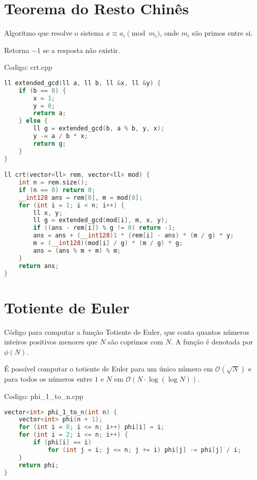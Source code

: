 \documentclass[10pt, a4paper, oneside]{book}
\begin{document}
\section{Teorema do Resto Chinês}


Algoritmo que resolve o sistema $x \equiv a_i \pmod{m_i}$, onde $m_i$ são primos entre si.



Retorna $-1$ se a resposta não existir.

\hfill

Codigo: crt.cpp

\begin{lstlisting}[language=C++]
ll extended_gcd(ll a, ll b, ll &x, ll &y) {
    if (b == 0) {
        x = 1;
        y = 0;
        return a;
    } else {
        ll g = extended_gcd(b, a % b, y, x);
        y -= a / b * x;
        return g;
    }
}

ll crt(vector<ll> rem, vector<ll> mod) {
    int n = rem.size();
    if (n == 0) return 0;
    __int128 ans = rem[0], m = mod[0];
    for (int i = 1; i < n; i++) {
        ll x, y;
        ll g = extended_gcd(mod[i], m, x, y);
        if ((ans - rem[i]) % g != 0) return -1;
        ans = ans + (__int128)1 * (rem[i] - ans) * (m / g) * y;
        m = (__int128)(mod[i] / g) * (m / g) * g;
        ans = (ans % m + m) % m;
    }
    return ans;
}
\end{lstlisting}
\hfill

\section{Totiente de Euler}


Código para computar a  função Totiente de Euler, que conta quantos números inteiros positivos menores que $N$ são coprimos com $N$. A função é denotada por $\phi(N)$.



É possível computar o totiente de Euler para um único número em $\mathcal{O}(\sqrt{N})$ e para todos os números entre $1$ e $N$ em $\mathcal{O}(N \cdot \log (\log N))$.

\hfill

Codigo: phi\_1\_to\_n.cpp

\begin{lstlisting}[language=C++]
vector<int> phi_1_to_n(int n) {
    vector<int> phi(n + 1);
    for (int i = 0; i <= n; i++) phi[i] = i;
    for (int i = 2; i <= n; i++) {
        if (phi[i] == i)
            for (int j = i; j <= n; j += i) phi[j] -= phi[j] / i;
    }
    return phi;
}
\end{lstlisting}
\hfill
\end{document}
